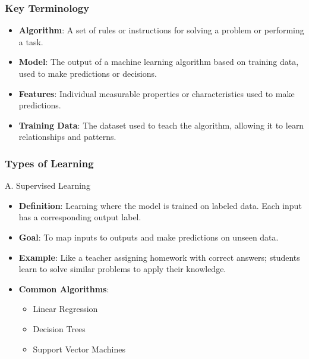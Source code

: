 \documentclass[aspectratio=169]{beamer}
\begin{document}
\begin{frame}[fragile]
    \frametitle{Key Terminology}
    \begin{itemize}
        \item \textbf{Algorithm}: A set of rules or instructions for solving a problem or performing a task.
        \item \textbf{Model}: The output of a machine learning algorithm based on training data, used to make predictions or decisions.
        \item \textbf{Features}: Individual measurable properties or characteristics used to make predictions.
        \item \textbf{Training Data}: The dataset used to teach the algorithm, allowing it to learn relationships and patterns.
    \end{itemize}
\end{frame}

\begin{frame}[fragile]
    \frametitle{Types of Learning}
    \begin{block}{A. Supervised Learning}
        \begin{itemize}
            \item \textbf{Definition}: Learning where the model is trained on labeled data. Each input has a corresponding output label.
            \item \textbf{Goal}: To map inputs to outputs and make predictions on unseen data.
            \item \textbf{Example}: Like a teacher assigning homework with correct answers; students learn to solve similar problems to apply their knowledge.
            \item \textbf{Common Algorithms}: 
                \begin{itemize}
                    \item Linear Regression
                    \item Decision Trees
                    \item Support Vector Machines
                \end{itemize}
        \end{itemize}
    \end{block}
\end{frame}
\end{document}
